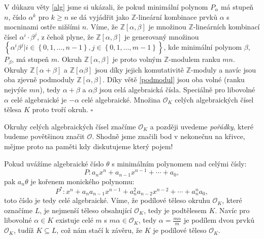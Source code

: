 \documentclass [12pt]{report}
\begin{document}
V důkazu věty \ref{alg} jsme si ukázali, že pokud minimální polynom $P_\alpha$ má stupeň $n$, číslo $\alpha^k$ pro $k \geqslant n$ se dá vyjádřit jako $\mathbb{Z}$-lineární kombinace prvků $\alpha$ s mocninami ostře nižšími $n$. Víme, že $\mathbb{Z}[\alpha,\beta]$ je množinou $\mathbb{Z}$-lineárních kombinací čísel $\alpha^i \cdot \beta^j$, z čehož plyne, že $\mathbb{Z}[\alpha,\beta]$ je generovaný množinou $\left\lbrace \alpha^i \beta^j \vert i \in \left\lbrace 0,1,\dots,n-1 \right\rbrace, j \in \left\lbrace 0,1,\dots,m-1 \right\rbrace \right\rbrace$, kde minimální polynom $\beta$, $P_\beta$, má stupeň $m$. Okruh $\mathbb{Z}[\alpha,\beta]$ je proto volným $\mathbb{Z}$-modulem ranku $mn$.\\

Okruhy $\mathbb{Z}[\alpha+\beta]$ a $\mathbb{Z}[\alpha \beta]$ jsou díky jejich komutativitě $\mathbb{Z}$-moduly a navíc jsou oba zjevně podmoduly $\mathbb{Z}[\alpha,\beta]$. Díky větě \ref{podmodul} jsou oba volné (ranku nejvýše $mn$), tedy $\alpha+\beta$ a $\alpha \beta$ jsou celá algebraická čísla. Speciálně pro libovolné $\alpha$ celé algebraické je $-\alpha$ celé algebraické. Množina $\mathcal{O}_K$ celých algebraických čísel tělesa $K$ proto tvoří okruh. \hfill $\square$\\

\begin{poznamka}
Okruhy celých algebraických čísel značíme $\mathcal{O}_K$ a později uvedeme \textit{pořádky}, které budeme povětšinou značit $\mathcal{O}$. Shodně jsme značili bod v nekonečnu na křivce, mějme proto na paměti kdy diskutujeme který pojem!
\end{poznamka}

Pokud uvážíme algebraické číslo $\theta$ s minimálním polynomem nad celými čísly:
\begin{equation*}
P : a_n x^n + a_{n-1} x^{n-1} + \cdots + a_0,
\end{equation*}
pak $a_n \theta$ je kořenem monického polynomu:
\begin{equation*}
P^* : x^n +a_n  a_{n-1} x^{n-1} + a_n ^2 a_{n-2} x^{n-2} + \cdots + a_n ^n a_0,
\end{equation*}
toto číslo je tedy celé algebraické. Víme, že podílové těleso okruhu $\mathcal{O}_K$, které označíme $L$, je nejmenší těleso obsahující $\mathcal{O}_K$, tedy je podtělesem $K$. Navíc pro libovolné $\alpha \in K$ existuje celé $m$ s $m \alpha \in \mathcal{O}_K$, tedy $\alpha = \frac{m \alpha}{m}$ je podílem dvou prvků $\mathcal{O}_K$, tudíž $K \subseteq L$, což nám stačí k závěru, že $K$ je podílové těleso $\mathcal{O}_K$.\\
\end{document}
